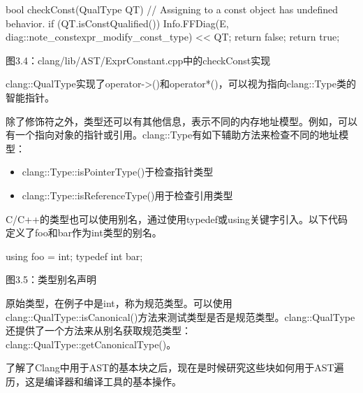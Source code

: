 \begin{cpp}
bool checkConst(QualType QT) {
  // Assigning to a const object has undefined behavior.
  if (QT.isConstQualified()) {
    Info.FFDiag(E, diag::note_constexpr_modify_const_type) << QT;
    return false;
  }
  return true;
}
\end{cpp}

\begin{center}
图3.4：clang/lib/AST/ExprConstant.cpp中的checkConst实现
\end{center}

clang::QualType实现了operator->()和operator*()，可以视为指向clang::Type类的智能指针。

除了修饰符之外，类型还可以有其他信息，表示不同的内存地址模型。例如，可以有一个指向对象的指针或引用。clang::Type有如下辅助方法来检查不同的地址模型：

\begin{itemize}
\item
clang::Type::isPointerType()于检查指针类型

\item
clang::Type::isReferenceType()用于检查引用类型
\end{itemize}

C/C++的类型也可以使用别名，通过使用typedef或using关键字引入。以下代码定义了foo和bar作为int类型的别名。

\begin{cpp}
using foo = int;
typedef int bar;
\end{cpp}

\begin{center}
图3.5：类型别名声明
\end{center}

原始类型，在例子中是int，称为规范类型。可以使用clang::QualType::isCanonical()方法来测试类型是否是规范类型。clang::QualType还提供了一个方法来从别名获取规范类型：clang::QualType::getCanonicalType()。

了解了Clang中用于AST的基本块之后，现在是时候研究这些块如何用于AST遍历，这是编译器和编译工具的基本操作。









































